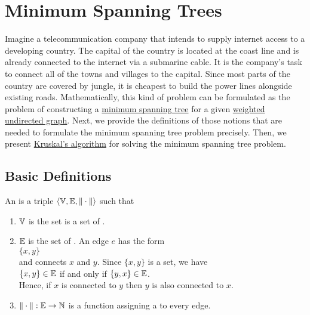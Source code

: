 \section{Minimum Spanning Trees}
Imagine a telecommunication company that intends to supply internet access to a developing country.
The capital of the country is located at the coast line and is already connected to the internet via
a submarine cable. It is the company's task to connect all of the towns and villages to the capital.
Since most parts of the country are covered by jungle, it is cheapest to build the power lines
alongside existing roads.  Mathematically, this kind of problem can be formulated as the problem of
constructing a \href{https://en.wikipedia.org/wiki/Minimum_spanning_tree}{minimum spanning tree} for
a given \href{https://en.wikipedia.org/wiki/Graph_(discrete_mathematics)#Weighted_graph}{weighted}
\href{https://en.wikipedia.org/wiki/Graph_(discrete_mathematics)#Undirected_graph}{undirected graph}.
Next, we provide the definitions of those notions that are needed to formulate the minimum spanning
tree problem precisely.  Then, we present
\href{https://en.wikipedia.org/wiki/Kruskal%27s_algorithm}{Kruskal's algorithm} for solving the
minimum spanning tree problem. 

\subsection{Basic Definitions}
\begin{Definition} An  is a triple 
   $\langle {\mathbb V}, {\mathbb E}, \|\cdot\| \rangle$ such that
  \begin{enumerate}
  \item ${\mathbb V}$ is the set is a set of  .
  \item ${\mathbb E}$ is the set of  .  An edge $e$ has the form
        \\[0.2cm]
        \hspace*{1.3cm}
        $\{x, y\}$
        \\[0.2cm]
        and connects $x$ and $y$.  Since $\{x,y\}$ is a set, we have
        \\[0.2cm]
        \hspace*{1.3cm}
        $\{x,y\} \in {\mathbb E}$ \quad if and only if $\{y,x\} \in {\mathbb E}$.
        \\[0.2cm]
        Hence, if $x$ is connected to $y$ then $y$ is also connected to $x$.
  \item $\|\cdot\|: {\mathbb E} \rightarrow {\mathbb N}$ is a function assigning a  to every edge.
        \conclude
  \end{enumerate}
\end{Definition}

